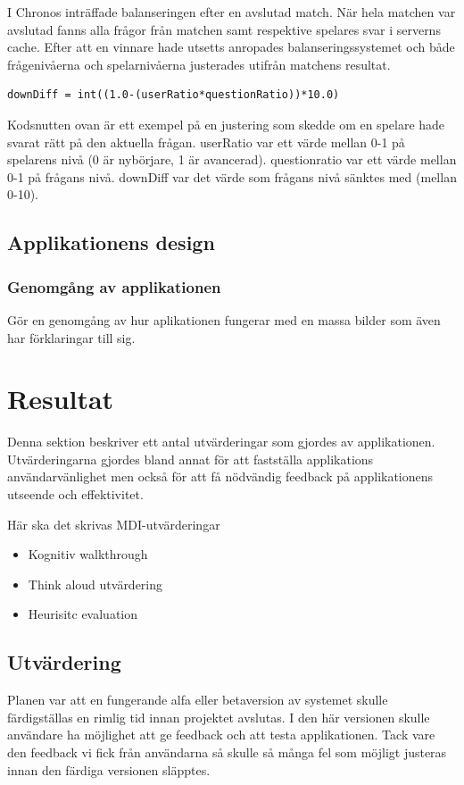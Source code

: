 \documentclass[a4paper, 11pt]{article}
\begin{document}
I Chronos inträffade balanseringen efter en avslutad match. När hela matchen var avslutad fanns alla frågor från matchen samt respektive spelares svar i serverns cache. Efter att en vinnare hade utsetts anropades balanseringssystemet och både frågenivåerna och spelarnivåerna justerades utifrån matchens resultat.

\begin{verbatim}
downDiff = int((1.0-(userRatio*questionRatio))*10.0)
\end{verbatim}

Kodsnutten ovan är ett exempel på en justering som skedde om en spelare hade svarat rätt på den aktuella frågan. userRatio var ett värde mellan 0-1 på spelarens nivå (0 är nybörjare, 1 är avancerad). questionratio var ett värde mellan 0-1 på frågans nivå. downDiff var det värde som frågans nivå sänktes med (mellan 0-10). 

\subsection{Applikationens design}

\subsubsection{Genomgång av applikationen}
Gör en genomgång av hur aplikationen fungerar med en massa bilder som även har förklaringar till sig.


\section{Resultat}
Denna sektion beskriver ett antal utvärderingar som gjordes av applikationen. Utvärderingarna gjordes bland annat för att fastställa applikations användarvänlighet men också för att få nödvändig feedback på applikationens utseende och effektivitet.  

Här ska det skrivas MDI-utvärderingar
\begin{itemize}
\item Kognitiv walkthrough
\item Think aloud utvärdering
\item Heurisitc evaluation
\end{itemize}

\subsection{Utvärdering}
Planen var att en fungerande alfa eller betaversion av systemet skulle färdigställas en rimlig tid innan projektet avslutas. I den här versionen skulle användare ha möjlighet att ge feedback och att testa applikationen. Tack vare den feedback vi fick från användarna så skulle så många fel som möjligt justeras innan den färdiga versionen släpptes.
\end{document}
